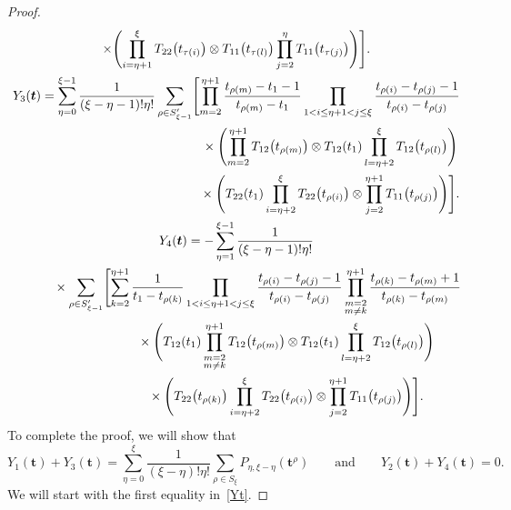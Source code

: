 \documentclass[pdftex]{sigma}
\numberwithin{equation}{section}
\begin{document}
\begin{proof}
\begin{gather*}
 \times\Biggl( \prod_{i=\eta+1}^{\xi } T _{22}\bigl(t_{\tau(i)}\bigr)\otimes T_{11}\bigl(t_{\tau(l)}\bigr)\prod_{j=2}^{\eta} T _{11}\bigl(t_{\tau(j)}\bigr)\Biggr) \Biggr].
\\
Y_3(\boldsymbol{t}) = \sum_{\eta=0}^{\xi-1} \frac{1}{(\xi-\eta-1) ! \eta!} \sum_{\rho\in S_{\xi-1}'} \Biggl[ \prod_{m=2}^{\eta+1 } \frac{t_{\rho(m)}-t_1-1}{t_{\rho(m)}-t_1} \prod_{1< i\leq\eta+1<j \leq \xi} \frac{t_{\rho(i)}-t_{\rho(j)}-1}{t_{\rho(i)}-t_{\rho(j)}} \\
\hphantom{Y_3(\boldsymbol{t}) = \sum_{\eta=0}^{\xi-1} \frac{1}{(\xi-\eta-1) ! \eta!} \sum_{\rho\in S_{\xi-1}'} \Biggl[}{}
 \times\Biggl( \prod_{m=2}^{\eta+1 } T_{12} \bigl(t_{\rho(m)}\bigr) \otimes T_{12}(t_1) \prod_{l=\eta+2}^{\xi } T_{12} \bigl(t_{\rho(l)}\bigr) \Biggr) \\
\hphantom{Y_3(\boldsymbol{t}) = \sum_{\eta=0}^{\xi-1} \frac{1}{(\xi-\eta-1) ! \eta!} \sum_{\rho\in S_{\xi-1}'} \Biggl[}{}
 \times\Biggl(T_{22}(t_1)\prod_{i=\eta+2}^{\xi } T _{22}\bigl(t_{\rho(i)}\bigr)\otimes \prod_{j=2}^{\eta+1} T _{11}\bigl(t_{\rho(j)}\bigr)\Biggr) \Biggr].
\\
Y_4(\boldsymbol{t})= -\sum_{\eta=1}^{\xi-1} \frac{1}{(\xi-\eta-1) ! \eta!} \\
\hphantom{Y_4(\boldsymbol{t})=}{}
 \times\sum_{\rho\in S_{\xi-1}'} \Biggl[ \sum_{k=2}^{\eta+1} \frac{1}{t_1-t_{\rho(k)}} \prod_{1< i\leq\eta+1<j \leq \xi} \frac{t_{\rho(i)}-t_{\rho(j)}-1}{t_{\rho(i)}-t_{\rho(j)}} \prod_{\substack{m=2\\m\neq k}}^{\eta+1} \frac{t_{\rho(k)}-t_{\rho(m)}+1}{t_{\rho(k)}-t_{\rho(m)}} \\
\hphantom{Y_4(\boldsymbol{t})=\times\sum_{\rho\in S_{\xi-1}'} \Biggl[}{}
 \times\Biggl(T_{12}(t_1) \prod_{\substack{m=2\\m\neq k}}^{\eta+1} T_{12} \bigl(t_{\rho(m)}\bigr) \otimes T_{12}(t_1) \prod_{l=\eta+2}^{\xi } T_{12} \bigl(t_{\rho(l)}\bigr) \Biggr) \\
\hphantom{Y_4(\boldsymbol{t})=\times\sum_{\rho\in S_{\xi-1}'} \Biggl[}{}
 \times\Biggl( T_{22}\bigl(t_{\rho(k)}\bigr)\prod_{i=\eta+2}^{\xi } T _{22}\bigl(t_{\rho(i)}\bigr)\otimes \prod_{j=2}^{\eta+1} T _{11}\bigl(t_{\rho(j)}\bigr)\Biggr) \Biggr].
\end{gather*}
To complete the proof, we will show that
\begin{equation}\label{Yt}
Y_1(\boldsymbol{t})+Y_3(\boldsymbol{t})=\sum_{\eta=0}^\xi \frac{1}{(\xi-\eta)!\eta!}\sum_{\rho\in S_\xi}P_{\eta,\xi-\eta}(\boldsymbol{t}^\rho) \qquad \text{and} \qquad Y_2(\boldsymbol{t})+Y_4(\boldsymbol{t})=0.
\end{equation}
We will start with the first equality in~\eqref{Yt}.


\end{proof}
\end{document}
